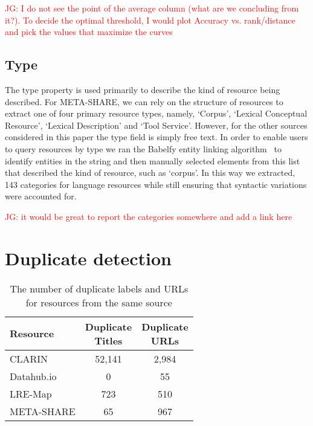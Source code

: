 \documentclass[11pt]{article}
\begin{document}
\textcolor{red}{JG: I do not see the point of the average column (what are we concluding from it?). To decide the optimal threshold, I would plot Accuracy vs. rank/distance and pick the values that maximize the curves}

\subsection{Type}

The type property is used primarily to describe the kind of resource being
described. For META-SHARE, we can rely on the structure of resources to extract
one of four primary resource types, namely, `Corpus', `Lexical Conceptual
Resource', `Lexical Description' and `Tool Service'. However, for the other
sources considered in this paper the type field is simply free text. In order 
to enable users to query resources by type we ran the Babelfy entity linking
algorithm~\cite{Moroetal:14tacl} to identify entities in the string and
then manually selected elements from this list that described the kind of
resource, such as `corpus'. In this way we extracted, 143 categories for
language resources while still ensuring that syntactic variations were accounted
for.

\textcolor{red}{JG: it would be great to report the categories somewhere and add a link here}

\section{Duplicate detection}

\label{duplicates}

\begin{table}
    \begin{center}
    \begin{tabular}{l|cc}
        Resource   & \thead{Duplicate \\ Titles} & \thead{Duplicate \\ URLs} \\
        \hline                                                            
        CLARIN     & 52,141           & 2,984          \\   
        Datahub.io & 0                & 55             \\
        LRE-Map    & 723              & 510            \\
        META-SHARE & 65               & 967            \\
    \end{tabular}
    \end{center}
    \caption{\label{tab:self-dupes}The number of duplicate labels and URLs for
    resources from the same source}
\end{table}
\end{document}
